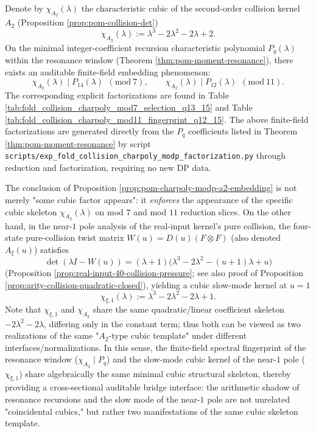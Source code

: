 \begin{proposition}\label{prop:pom-charpoly-modp-a2-embedding}
Denote by \(\chi_{A_2}(\lambda)\) the characteristic cubic of the second-order collision kernel \(A_2\) (Proposition \ref{prop:pom-collision-det})
\[
\chi_{A_2}(\lambda):=\lambda^3-2\lambda^2-2\lambda+2.
\]
On the minimal integer-coefficient recursion characteristic polynomial \(P_q(\lambda)\) within the resonance window (Theorem \ref{thm:pom-moment-resonance}), there exists an auditable finite-field embedding phenomenon:
\[
\boxed{\;
\chi_{A_2}(\lambda)\mid P_{14}(\lambda)\ \ (\mathrm{mod}\ 7),
\qquad
\chi_{A_2}(\lambda)\mid P_{12}(\lambda)\ \ (\mathrm{mod}\ 11).\;}
\]
The corresponding explicit factorizations are found in Table \ref{tab:fold_collision_charpoly_mod7_selection_q13_15} and Table \ref{tab:fold_collision_charpoly_mod11_fingerprint_q12_15}.
The above finite-field factorizations are generated directly from the \(P_q\) coefficients listed in Theorem \ref{thm:pom-moment-resonance} by script \texttt{scripts/exp\_fold\_collision\_charpoly\_modp\_factorization.py} through reduction and factorization, requiring no new DP data.
\end{proposition}

\begin{remark}\label{rem:pom-a2-cubic-skeleton-crosschapter}
The conclusion of Proposition \ref{prop:pom-charpoly-modp-a2-embedding} is not merely "some cubic factor appears": it \emph{enforces} the appearance of the specific cubic skeleton \(\chi_{A_2}(\lambda)\) on mod \(7\) and mod \(11\) reduction slices.
On the other hand, in the near-\(1\) pole analysis of the real-input kernel's pure collision, the four-state pure-collision twist matrix \(W(u)=D(u)(F\otimes F)\) (also denoted \(A_\xi(u)\)) satisfies
\[
\det(\lambda I-W(u))=(\lambda+1)\bigl(\lambda^3-2\lambda^2-(u+1)\lambda+u\bigr)
\]
(Proposition \ref{prop:real-input-40-collision-pressure}; see also proof of Proposition \ref{prop:arity-collision-quadratic-closed}), yielding a cubic slow-mode kernel at \(u=1\)
\[
\chi_{\xi,1}(\lambda):=\lambda^3-2\lambda^2-2\lambda+1.
\]
Note that \(\chi_{\xi,1}\) and \(\chi_{A_2}\) share the same quadratic/linear coefficient skeleton \(-2\lambda^2-2\lambda\), differing only in the constant term; thus both can be viewed as two realizations of the same "\(A_2\)-type cubic template" under different interfaces/normalizations.
In this sense, the finite-field spectral fingerprint of the resonance window (\(\chi_{A_2}\mid P_q\)) and the slow-mode cubic kernel of the near-\(1\) pole (\(\chi_{\xi,1}\)) share algebraically the same minimal cubic structural skeleton, thereby providing a cross-sectional auditable bridge interface: the arithmetic shadow of resonance recursions and the slow mode of the near-\(1\) pole are not unrelated "coincidental cubics," but rather two manifestations of the same cubic skeleton template.
\end{remark}

